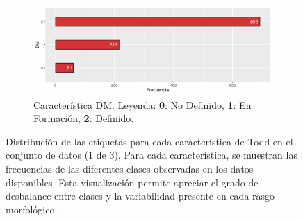 \begin{figure}[p]
    \begin{subfigure}{\textwidth}
        \includegraphics[width=\linewidth]{../../scripts/eda/eda_univar/char_dm_distr.pdf}
        \caption{Característica DM. Leyenda: \textbf{0}: No Definido, \textbf{1}: En Formación, \textbf{2}: Definido.}
        \label{fig4:todd_chars__dm}
    \end{subfigure}
    \caption[Distribución de las características de Todd (1 de 3)]{Distribución de las etiquetas para cada característica de Todd en el conjunto de datos (1 de 3). Para cada característica, se muestran las frecuencias de las diferentes clases observadas en los datos disponibles. Esta visualización permite apreciar el grado de desbalance entre clases y la variabilidad presente en cada rasgo morfológico.}
    \label{fig4:todd_chars_1}

\end{figure}
